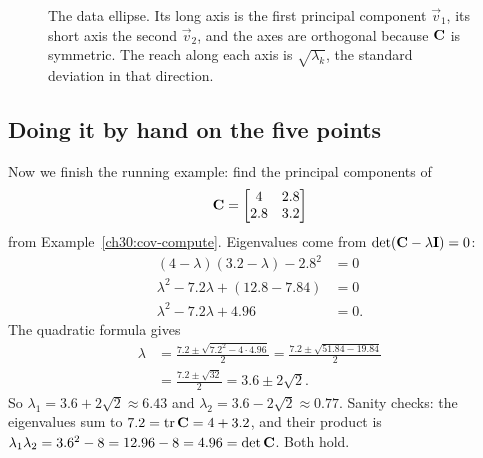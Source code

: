 \begin{figure}[H]
\centering
{}
\caption{The data ellipse. Its long axis is the first principal component $\vec
v_1$, its short axis the second $\vec v_2$, and the axes are orthogonal because
$\mathbf{C}$ is symmetric. The reach along each axis is $\sqrt{\lambda_k}$, the
standard deviation in that direction.}
\label{ch30:ellipse}
\end{figure}

\subsection{Doing it by hand on the five points}

Now we finish the running example: find the principal components of
\[
  \mathbf{C}=\begin{bmatrix}4 & 2.8\\ 2.8 & 3.2\end{bmatrix}
\]
from Example~\ref{ch30:cov-compute}. Eigenvalues come from
$\det(\mathbf{C}-\lambda\mathbf{I})=0$:
\begin{align*}
  (4-\lambda)(3.2-\lambda)-2.8^2&=0\\
  \lambda^2-7.2\lambda+(12.8-7.84)&=0\\
  \lambda^2-7.2\lambda+4.96&=0 .
\end{align*}
The quadratic formula gives
\begin{align*}
  \lambda&=\frac{7.2\pm\sqrt{7.2^2-4\cdot 4.96}}{2}
        =\frac{7.2\pm\sqrt{51.84-19.84}}{2}\\
        &=\frac{7.2\pm\sqrt{32}}{2}
        =3.6\pm 2\sqrt2 .
\end{align*}
So $\lambda_1=3.6+2\sqrt2\approx 6.43$ and $\lambda_2=3.6-2\sqrt2\approx 0.77$.
Sanity checks: the eigenvalues sum to $7.2=\operatorname{tr}\mathbf{C}=4+3.2$, and their product is
$\lambda_1\lambda_2=3.6^2-8=12.96-8=4.96=\det\mathbf{C}$. Both hold.

